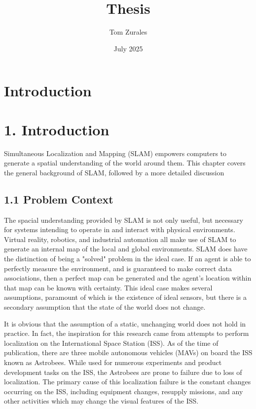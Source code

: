 \documentclass[12pt]{article}
\title{Thesis}
\author{Tom Zurales}
\date{July 2025}
\begin{document}
\doublespace

\maketitle

\section{Introduction}

\section{1. Introduction}

Simultaneous Localization and Mapping (SLAM) empowers computers to generate a spatial understanding of the world around them. This chapter covers the general background of SLAM, followed by a more detailed discussion 

\subsection{1.1 Problem Context}

The spacial understanding provided by SLAM is not only useful, but necessary for systems intending to operate in and interact with physical environments. Virtual reality, robotics, and industrial automation all make use of SLAM to generate an internal map of the local and global environments. SLAM does have the distinction of being a "solved" problem in the ideal case. If an agent is able to perfectly measure the environment, and is guaranteed to make correct data associations, then a perfect map can be generated and the agent's location within that map can be known with certainty. This ideal case makes several assumptions, paramount of which is the existence of ideal sensors, but there is a secondary assumption that the state of the world does not change.

It is obvious that the assumption of a static, unchanging world does not hold in practice. In fact, the inspiration for this research came from attempts to perform localization on the International Space Station (ISS). As of the time of publication, there are three mobile autonomous vehicles (MAVs) on board the ISS known as Astrobees. While used for numerous experiments and product development tasks on the ISS, the Astrobees are prone to failure due to loss of localization. The primary cause of this localization failure is the constant changes occurring on the ISS, including equipment changes, resupply missions, and any other activities which may change the visual features of the ISS.
\end{document}

